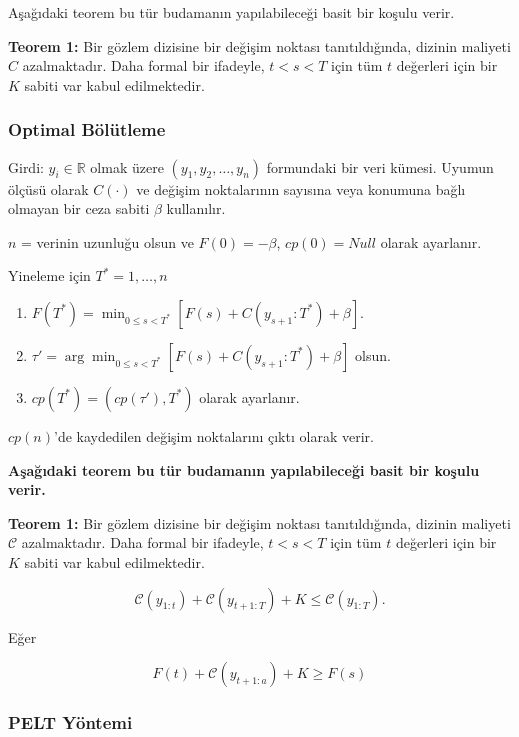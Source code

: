 \documentclass[12pt,twoside]{deuthesis}
\begin{document}
Aşağıdaki teorem bu tür budamanın yapılabileceği basit bir koşulu verir.

\textbf{Teorem 1:} Bir gözlem dizisine bir değişim noktası tanıtıldığında, dizinin maliyeti \(C\) azalmaktadır. Daha formal bir ifadeyle, \(t < s < T\) için tüm \(t\) değerleri için bir \(K\) sabiti var kabul edilmektedir.

\subsubsection{Optimal Bölütleme}\label{optimal-buxf6luxfctleme}

Girdi: \(y_i \in \mathbb{R}\) olmak üzere \((y_1, y_2, \ldots, y_n)\) formundaki bir veri kümesi. Uyumun ölçüsü olarak \(C(\cdot)\) ve değişim noktalarının sayısına veya konumuna bağlı olmayan bir ceza sabiti \(\beta\) kullanılır.

\(n\) = verinin uzunluğu olsun ve \(F(0) = -\beta\), \(cp(0) = Null\) olarak ayarlanır.

Yineleme için \(T^* = 1, \ldots, n\)

\begin{enumerate}
\def\labelenumi{\arabic{enumi}.}
\item
  \(F(T^*) = \min_{0 \leq s < T^*} [F(s) + C(y_{s+1}:T^*) + \beta]\).
\item
  \(\tau' = \arg \min_{0 \leq s < T^*} [F(s) + C(y_{s+1}:T^*) + \beta]\) olsun.
\item
  \(cp(T^*) = (cp(\tau'), T^*)\) olarak ayarlanır.
\end{enumerate}

\(cp(n)\)'de kaydedilen değişim noktalarını çıktı olarak verir.

\textbf{Aşağıdaki teorem bu tür budamanın yapılabileceği basit bir koşulu verir.}

\textbf{Teorem 1:} Bir gözlem dizisine bir değişim noktası tanıtıldığında, dizinin maliyeti \(\mathcal{C}\) azalmaktadır. Daha formal bir ifadeyle, \(t < s < T\) için tüm \(t\) değerleri için bir \(K\) sabiti var kabul edilmektedir.

\[
\mathcal{C}(y_{1:t}) + \mathcal{C}(y_{t+1:T}) + K \leq \mathcal{C}(y_{1:T}).
\]

Eğer

\[
F(t) + \mathcal{C}(y_{t+1:a}) + K \geq F(s)
\]

\subsubsection{PELT Yöntemi}\label{pelt-yuxf6ntemi}
\end{document}
